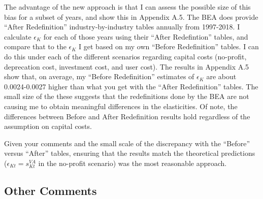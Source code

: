 \documentclass[11pt]{article}
\begin{document}
The advantage of the new approach is that I can assess the possible size of this bias for a subset of years, and show this in Appendix A.5. The BEA does provide ``After Redefinition'' industry-by-industry tables annually from 1997-2018. I calculate $\epsilon_K$ for each of those years using their ``After Redefintion'' tables, and compare that to the $\epsilon_K$ I get based on my own ``Before Redefinition'' tables. I can do this under each of the different scenarios regarding capital costs (no-profit, deprecation cost, investment cost, and user cost). The results in Appendix A.5 show that, on average, my ``Before Redefinition'' estimates of $\epsilon_K$ are about 0.0024-0.0027 higher than what you get with the ``After Redefinition'' tables. The small size of the these suggests that the redefinitions done by the BEA are not causing me to obtain meaningful differences in the elasticities. Of note, the differences between Before and After Redefinition results hold regardless of the assumption on capital costs.

Given your comments and the small scale of the discrepancy with the ``Before'' versus ``After'' tables, ensuring that the results match the theoretical predictions ($\epsilon_{Kt} = s_{Kt}^{VA}$ in the no-profit scenario) was the most reasonable approach. 

\subsection*{Other Comments}
\end{document}
